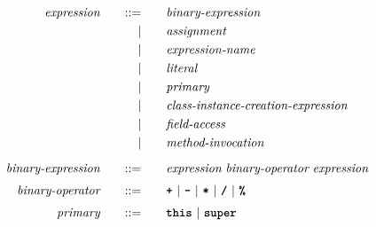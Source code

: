 \begin{alignat*}{9}
&& \textit{expression}                           && \quad ::= & \quad && \textit{binary-expression} && \\
&&                                               &&         | & \quad && \textit{assignment} && \\
&&                                               &&         | & \quad && \textit{expression-name} && \\
&&                                               &&         | & \quad && \textit{literal} && \\
&&                                               &&         | & \quad && \textit{primary} && \\
&&                                               &&         | & \quad && \textit{class-instance-creation-expression} && \\
&&                                               &&         | & \quad && \textit{field-access} && \\
&&                                               &&         | & \quad && \textit{method-invocation} && \\[2mm]
&& \textit{binary-expression}                    && \quad ::= & \quad && \textit{expression} \ \textit{binary-operator} \ \textit{expression} && \\[1mm]
&& \textit{binary-operator}                      && \quad ::= & \quad && \textbf{\texttt{+}} \ | \ \textbf{\texttt{-}} \ | \ \textbf{\texttt{*}} \ | \ \textbf{\texttt{/}} \ | \ \textbf{\texttt{\%}} && \\[1mm]
&& \textit{primary}                              && \quad ::= & \quad && \textbf{\texttt{this}} \ | \ \textbf{\texttt{super}} && \\[1mm]
\end{alignat*}
